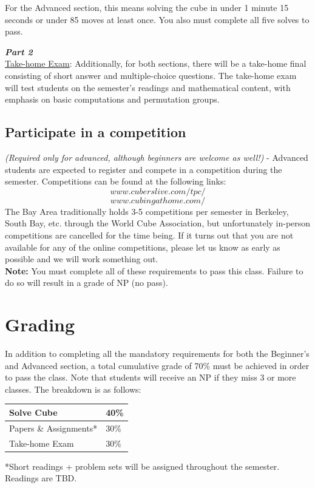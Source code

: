 \documentclass[11pt]{article}
\begin{document}
For the Advanced section, this means solving the cube in under 1 minute 15 seconds or under 85 moves at least once. You also must complete all five solves to pass.

\textit{\textbf{Part 2}} \\
\underline{Take-home Exam}: Additionally, for both sections, there will be a take-home final consisting of short answer and multiple-choice questions.
The take-home exam will test students on the semester’s readings and mathematical content, with emphasis on basic computations and permutation groups.


\subsection*{Participate in a competition}
\textit{(Required only for advanced, although beginners are welcome as well!)} - Advanced students are expected to register and compete in a competition during the semester. Competitions can be found at the following links:
\[www.cuberslive.com/tpc/\]
\[www.cubingathome.com/\]
The Bay Area traditionally holds 3-5 competitions per semester in Berkeley, South Bay, etc. through the World Cube Association, but unfortunately in-person competitions are cancelled for the time being. If it turns out that you are not available for any of the online competitions, please let us know as early as possible and we will work something out.\\
\textbf{Note:} You must complete all of these requirements to pass this class. Failure to do so will result in a grade of NP (no pass).


\section*{Grading}
In addition to completing all the mandatory requirements for both the Beginner’s and Advanced section, a total cumulative grade of 70\% must be achieved in order to pass the class. Note that students will receive an NP if they miss 3 or more classes. The breakdown is as follows:
\begin{center}
\begin{tabular}{|l|l|}
\hline
Solve Cube             & 40\% \\ \hline
Papers \& Assignments* & 30\% \\ \hline
Take-home Exam         & 30\% \\ \hline
\end{tabular}
\end{center}
\begin{footnotesize}
*Short readings + problem sets will be assigned throughout the semester. Readings are TBD. 
\end{footnotesize}
\end{document}
